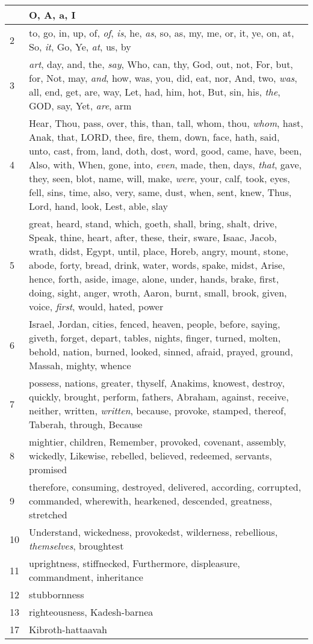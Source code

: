 \begin{longtable}{l|p{3.75in}}
\hline \hline
\endlastfoot
1 & O, A, a, I \\ \hline
2 & to, go, in, up, of, \emph{of}, \emph{is}, he, \emph{as}, so, as, my, me, or, it, ye, on, at, So, \emph{it}, Go, Ye, \emph{at}, us, by \\ \hline
3 & \emph{art}, day, and, the, \emph{say}, Who, can, thy, God, out, not, For, but, for, Not, may, \emph{and}, how, was, you, did, eat, nor, And, two, \emph{was}, all, end, get, are, way, Let, had, him, hot, But, sin, his, \emph{the}, GOD, say, Yet, \emph{are}, arm \\ \hline
4 & Hear, Thou, pass, over, this, than, tall, whom, thou, \emph{whom}, hast, Anak, that, LORD, thee, fire, them, down, face, hath, said, unto, cast, from, land, doth, dost, word, good, came, have, been, Also, with, When, gone, into, \emph{even}, made, then, days, \emph{that}, gave, they, seen, blot, name, will, make, \emph{were}, your, calf, took, eyes, fell, sins, time, also, very, same, dust, when, sent, knew, Thus, Lord, hand, look, Lest, able, slay \\ \hline
5 & great, heard, stand, which, goeth, shall, bring, shalt, drive, Speak, thine, heart, after, these, their, sware, Isaac, Jacob, wrath, didst, Egypt, until, place, Horeb, angry, mount, stone, abode, forty, bread, drink, water, words, spake, midst, Arise, hence, forth, aside, image, alone, under, hands, brake, first, doing, sight, anger, wroth, Aaron, burnt, small, brook, given, voice, \emph{first}, would, hated, power \\ \hline
6 & Israel, Jordan, cities, fenced, heaven, people, before, saying, giveth, forget, depart, tables, nights, finger, turned, molten, behold, nation, burned, looked, sinned, afraid, prayed, ground, Massah, mighty, whence \\ \hline
7 & possess, nations, greater, thyself, Anakims, knowest, destroy, quickly, brought, perform, fathers, Abraham, against, receive, neither, written, \emph{written}, because, provoke, stamped, thereof, Taberah, through, Because \\ \hline
8 & mightier, children, Remember, provoked, covenant, assembly, wickedly, Likewise, rebelled, believed, redeemed, servants, promised \\ \hline
9 & therefore, consuming, destroyed, delivered, according, corrupted, commanded, wherewith, hearkened, descended, greatness, stretched \\ \hline
10 & Understand, wickedness, provokedst, wilderness, rebellious, \emph{themselves}, broughtest \\ \hline
11 & uprightness, stiffnecked, Furthermore, displeasure, commandment, inheritance \\ \hline
12 & stubbornness \\ \hline
13 & righteousness, Kadesh-barnea \\ \hline
17 & Kibroth-hattaavah \\ \hline
\end{longtable}






